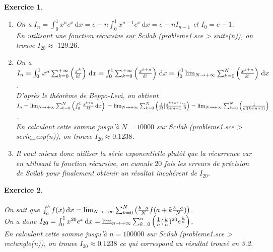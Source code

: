 \documentclass[a4paper,11pt]{article}
\newtheorem{exo}{Exercice}
\begin{document}
\begin{exo} \ \\
\begin{enumerate}
\item
On a $ I_n=\int_{0}^{1} x^ne^x \, \mathrm{d}x = e-n\int_{0}^{1} x^{n-1}e^x \, \mathrm{d}x = e-nI_{n-1} $ et $ I_0=e-1 $. \ \\
En utilisant une fonction récursive sur Scilab (probleme1.sce > suite(n)), on trouve $ I_{20}\approx\text{-}129.26 $.
\item
On a $ I_n = \int_{0}^{1} x^n\sum_{k=0}^{\text{+}\infty} \left (\frac{x^k}{k!} \right) \, \mathrm{d}x = \int_{0}^{1} \sum_{k=0}^{\text{+}\infty} \left (\frac{x^{k+n}}{k!} \right) \, \mathrm{d}x = \int_{0}^{1} \lim_{N\to\\{\text{+}\infty}}\sum_{k=0}^{N} \left (\frac{x^{k+n}}{k!} \right) \, \mathrm{d}x $. \ \\
D'après le théorème de Beppo-Levi, on obtient $ I_n = \lim_{N\to\\{\text{+}\infty}}\sum_{k=0}^{N} \left(\int_{0}^{1} \frac{x^{k+n}}{k!} \, \mathrm{d}x \right) \newline = \lim_{N\to\\{\text{+}\infty}}\sum_{k=0}^{N} \left(\frac{1}{k!}[\frac{x^{k+n+1}}{k+n+1}]_0^1 \right) = \lim_{N\to\\{\text{+}\infty}}\sum_{k=0}^{N} \left(\frac{1}{k!(k+n+1)} \right) $. \ \\
En calculant cette somme jusqu'à $ N=10000 $ sur Scilab (probleme1.sce > serie\_exp(n)), on trouve $ I_{20}\approx0.1238 $.
\item
Il vaut mieux donc utiliser la série exponentielle plutôt que la récurrence car en utilisant la fonction récursive, on cumule $ 20 $ fois les erreurs de précision de Scilab pour finalement obtenir un résultat incohérent de $ I_{20} $.
\end{enumerate}
\end{exo}

\begin{exo} \ \\ \\
On sait que $ \int_{a}^{b} f(x) \, \mathrm{d}x = \lim_{N\to\\{\text{+}\infty}}\sum_{k=0}^{N} \left(\frac{b-a}{N}f(a+k\frac{b-a}{N}) \right) $. \ \\
On a donc $ I_{20} = \int_{0}^{1} x^{20}e^x \, \mathrm{d}x = \lim_{n\to\\{\text{+}\infty}}\sum_{k=0}^{n} \left(\frac{1}{n}(\frac{k}{n})^{20}e^{\frac{k}{n}} \right) $. \ \\
En calculant cette somme jusqu'à $ n=100000 $ sur Scilab (probleme1.sce > rectangle(n)), on trouve $ I_{20}\approx0.1238 $ ce qui correspond au résultat trouvé en 3.2.
\end{exo}
\end{document}
